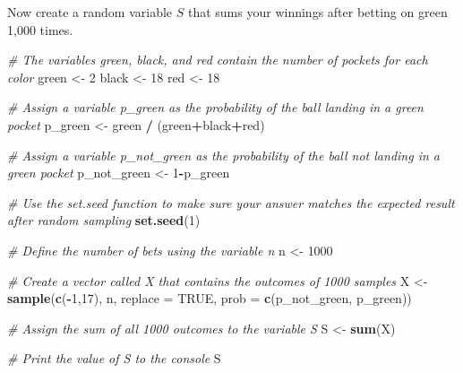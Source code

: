 \documentclass[
]{article}
\newenvironment{Shaded}{\begin{snugshade}}{\end{snugshade}}
\newcommand{\CommentTok}[1]{\textcolor[rgb]{0.56,0.35,0.01}{\textit{#1}}}
\newcommand{\DataTypeTok}[1]{\textcolor[rgb]{0.13,0.29,0.53}{#1}}
\newcommand{\DecValTok}[1]{\textcolor[rgb]{0.00,0.00,0.81}{#1}}
\newcommand{\KeywordTok}[1]{\textcolor[rgb]{0.13,0.29,0.53}{\textbf{#1}}}
\newcommand{\NormalTok}[1]{#1}
\newcommand{\OperatorTok}[1]{\textcolor[rgb]{0.81,0.36,0.00}{\textbf{#1}}}
\newcommand{\OtherTok}[1]{\textcolor[rgb]{0.56,0.35,0.01}{#1}}
\newcommand{\StringTok}[1]{\textcolor[rgb]{0.31,0.60,0.02}{#1}}
\begin{document}
Now create a random variable \(S\) that sums your winnings after betting
on green 1,000 times.

\begin{Shaded}
\begin{Highlighting}[]
\CommentTok{\# The variables \textquotesingle{}green\textquotesingle{}, \textquotesingle{}black\textquotesingle{}, and \textquotesingle{}red\textquotesingle{} contain the number of pockets for each color}
\NormalTok{green \textless{}{-}}\StringTok{ }\DecValTok{2}
\NormalTok{black \textless{}{-}}\StringTok{ }\DecValTok{18}
\NormalTok{red \textless{}{-}}\StringTok{ }\DecValTok{18}

\CommentTok{\# Assign a variable \textasciigrave{}p\_green\textasciigrave{} as the probability of the ball landing in a green pocket}
\NormalTok{p\_green \textless{}{-}}\StringTok{ }\NormalTok{green }\OperatorTok{/}\StringTok{ }\NormalTok{(green}\OperatorTok{+}\NormalTok{black}\OperatorTok{+}\NormalTok{red)}

\CommentTok{\# Assign a variable \textasciigrave{}p\_not\_green\textasciigrave{} as the probability of the ball not landing in a green pocket}
\NormalTok{p\_not\_green \textless{}{-}}\StringTok{ }\DecValTok{1}\OperatorTok{{-}}\NormalTok{p\_green}

\CommentTok{\# Use the \textasciigrave{}set.seed\textasciigrave{} function to make sure your answer matches the expected result after random sampling}
\KeywordTok{set.seed}\NormalTok{(}\DecValTok{1}\NormalTok{)}

\CommentTok{\# Define the number of bets using the variable \textquotesingle{}n\textquotesingle{}}
\NormalTok{n \textless{}{-}}\StringTok{ }\DecValTok{1000}

\CommentTok{\# Create a vector called \textquotesingle{}X\textquotesingle{} that contains the outcomes of 1000 samples}
\NormalTok{X \textless{}{-}}\StringTok{ }\KeywordTok{sample}\NormalTok{(}\KeywordTok{c}\NormalTok{(}\OperatorTok{{-}}\DecValTok{1}\NormalTok{,}\DecValTok{17}\NormalTok{), n, }\DataTypeTok{replace =} \OtherTok{TRUE}\NormalTok{, }\DataTypeTok{prob =} \KeywordTok{c}\NormalTok{(p\_not\_green, p\_green)) }

\CommentTok{\# Assign the sum of all 1000 outcomes to the variable \textquotesingle{}S\textquotesingle{}}
\NormalTok{S \textless{}{-}}\StringTok{ }\KeywordTok{sum}\NormalTok{(X)}

\CommentTok{\# Print the value of \textquotesingle{}S\textquotesingle{} to the console}
\NormalTok{S}
\end{Highlighting}
\end{Shaded}
\end{document}

